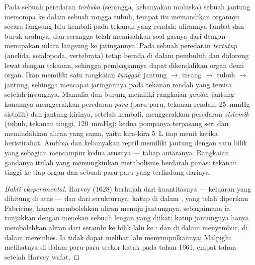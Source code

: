\begin{definition}\label{def:b2:blood-circulation:circuits}
%
Pada sebuah peredaran \emph{terbuka} (serangga, kebanyakan moluska)
sebuah jantung memompa  ke dalam sebuah rongga tubuh, tempat 
itu memandikan organnya secara langsung lalu kembali pada tekanan yang
rendah; alirannya lambat dan buruk arahnya, dan serangga telah
memisahkan soal gasnya dari  dengan memipakan udara langsung ke
jaringannya. Pada sebuah peredaran \emph{tertutup} (anelida, sefalopoda,
vertebrata)  tetap berada di dalam pembuluh dan didorong lewat
 dengan tekanan, sehingga pembagiannya dapat dikendalikan organ
demi organ. Ikan memiliki satu rangkaian \emph{tunggal}: jantung $\to$
insang $\to$ tubuh $\to$ jantung, sehingga  mencapai jaringannya
pada tekanan rendah yang tersisa setelah  insangnya. Mamalia dan
burung memiliki rangkaian \emph{ganda}: jantung kanannya menggerakkan
peredaran \emph{paru} (paru-paru, tekanan rendah, \qty{25}{mmHg}
sistolik) dan jantung kirinya, setelah  kembali, menggerakkan
peredaran \emph{sistemik} (tubuh, tekanan tinggi, \qty{120}{mmHg});
kedua pompanya terpasang seri dan memindahkan aliran yang sama, yaitu
kira-kira \qty{5}{L} tiap menit ketika beristirahat. Amfibia dan
kebanyakan reptil memiliki jantung dengan satu bilik yang sebagian
mencampur kedua arusnya --- tahap antaranya. Rangkaian gandanya itulah
yang memungkinkan metabolisme berdarah panas: tekanan tinggi ke tiap
organ dan sebuah paru-paru yang terlindung darinya.
\end{definition}
\begin{proof}[Bukti eksperimental]
Harvey (1628) berhujah dari kuantitasnya --- keluaran yang dihitung di
atas --- dan dari strukturnya: katup di dalam , yang telah
diperikan Fabricius, hanya membolehkan aliran menuju jantungnya,
sebagaimana ia tunjukkan dengan menekan  sebuah lengan yang
diikat; katup jantungnya hanya membolehkan aliran dari serambi ke bilik
lalu ke ; dan  di dalam  menyembur, di dalam 
merembes. Ia tidak dapat melihat  lalu menyimpulkannya;
Malpighi melihatnya di dalam paru-paru seekor katak pada tahun 1661,
empat tahun setelah Harvey wafat.
\end{proof}

